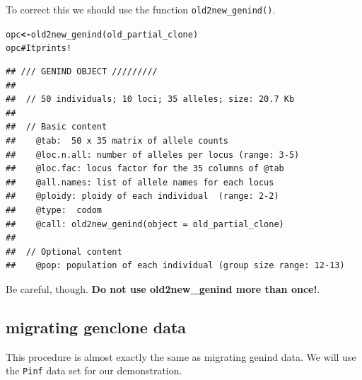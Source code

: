 \documentclass[letterpaper]{article}\usepackage[]{graphicx}\usepackage[]{color}
\makeatletter
\newcommand{\hlcom}[1]{\textcolor[rgb]{1,0.502,0}{#1}}%
\newcommand{\hlstd}[1]{\textcolor[rgb]{0,0,0}{#1}}%
\newcommand{\hlkwb}[1]{\textcolor[rgb]{0.502,0.502,0.753}{\textbf{#1}}}%
\newcommand{\hlkwd}[1]{\textcolor[rgb]{0,0.267,0.4}{#1}}%
\newenvironment{kframe}{%
 \def\at@end@of@kframe{}%
 \ifinner\ifhmode%
  \def\at@end@of@kframe{\end{minipage}}%
  \begin{minipage}{\columnwidth}%
 \fi\fi%
 \def\FrameCommand##1{\hskip\@totalleftmargin \hskip-\fboxsep
 \colorbox{shadecolor}{##1}\hskip-\fboxsep
     \hskip-\linewidth \hskip-\@totalleftmargin \hskip\columnwidth}%
 \MakeFramed {\advance\hsize-\width
   \@totalleftmargin\z@ \linewidth\hsize
   \@setminipage}}%
 {\par\unskip\endMakeFramed%
 \at@end@of@kframe}
\newenvironment{knitrout}{}{} %
\makeatother
\begin{document}
To correct this we should use the function \texttt{old2new\_genind()}.

\begin{knitrout}
\color{fgcolor}\begin{kframe}
\begin{alltt}
\hlstd{opc} \hlkwb{<-} \hlkwd{old2new_genind}\hlstd{(old_partial_clone)}
\hlstd{opc} \hlcom{# It prints!}
\end{alltt}
\begin{verbatim}
## /// GENIND OBJECT /////////
## 
##  // 50 individuals; 10 loci; 35 alleles; size: 20.7 Kb
## 
##  // Basic content
##    @tab:  50 x 35 matrix of allele counts
##    @loc.n.all: number of alleles per locus (range: 3-5)
##    @loc.fac: locus factor for the 35 columns of @tab
##    @all.names: list of allele names for each locus
##    @ploidy: ploidy of each individual  (range: 2-2)
##    @type:  codom
##    @call: old2new_genind(object = old_partial_clone)
## 
##  // Optional content
##    @pop: population of each individual (group size range: 12-13)
\end{verbatim}
\end{kframe}
\end{knitrout}

Be careful, though. \textbf{Do not use old2new\_genind more than once!}.

\subsection{migrating genclone data}

This procedure is almost exactly the same as migrating genind data. We will use
the \texttt{Pinf} data set for our demonstration.
\end{document}
